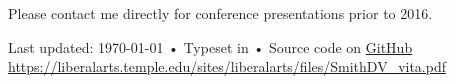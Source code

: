 \documentclass[11pt, letterpaper]{article}
\begin{document}
\vspace{.5cm}
Please contact me directly for conference presentations prior to 2016. 




\vfill{}

\begin{center}
{\scriptsize  Last updated: \today\- •\-
Typeset in \href{http://nitens.org/taraborelli/cvtex}{\XeTeX} •\- Source code on \href{https://github.com/DVSneuro/my-cv}{GitHub}\\
\href{https://liberalarts.temple.edu/sites/liberalarts/files/SmithDV\_vita.pdf}{https://liberalarts.temple.edu/sites/liberalarts/files/SmithDV\_vita.pdf}}
\end{center}
\end{document}

